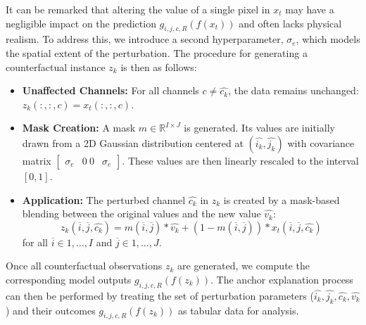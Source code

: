 It can be remarked that altering the value of a single pixel in $x_t$ may have a negligible impact on the prediction $g_{i,j,c,R}(f(x_t))$ and often lacks physical realism. To address this, we introduce a second hyperparameter, $\sigma_e$, which models the spatial extent of the perturbation. The procedure for generating a counterfactual instance $z_k$ is then as follows:
\begin{itemize}
	\item \textbf{Unaffected Channels:} For all channels $c \neq \widehat{c_k}$, the data remains unchanged: $z_k(:, :, c) = x_t(:, :, c)$.
	
	\item \textbf{Mask Creation:} A mask $m \in \mathbb{R}^{I \times J}$ is generated. Its values are initially drawn from a 2D Gaussian distribution centered at $(\widehat{i_k}, \widehat{j_k})$ with covariance matrix $\begin{bmatrix} \sigma_e & 0 \ 0 & \sigma_e \end{bmatrix}$. These values are then linearly rescaled to the interval $[0, 1]$.
	
	\item \textbf{Application:} The perturbed channel $\widehat{c_k}$ in $z_k$ is created by a mask-based blending between the original values and the new value $\widehat{v_k}$:
	\begin{equation}
		z_k(\overline{i} , \overline{j} , \widehat{c_k}) = m(\overline{i} , \overline{j} ) * \widehat{v_k} + (1 - m(\overline{i} , \overline{j})) * x_t(\overline{i} , \overline{j}, \widehat{c_k})
		\label{eq:anchor-perturbation}
	\end{equation}
	for all $\overline{i} \in {1, \ldots, I}$ and $\overline{j} \in {1, \ldots, J}$.
\end{itemize}

Once all counterfactual observations ${z_k}$ are generated, we compute the corresponding model outputs $g_{i,j,c,R}(f(z_k))$. The anchor explanation process can then be performed by treating the set of perturbation parameters ($\widehat{i_k}, \widehat{j_k}, \widehat{c_k}, \widehat{v_k}$) and their outcomes $g_{i,j,c,R}(f(z_k))$ as tabular data for analysis.


